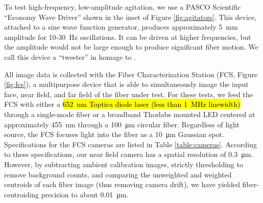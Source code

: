 \documentclass[twocolumn]{emulateapj}
\begin{document}
To test high-frequency, low-amplitude agitation, we use a PASCO Scientific ``Economy Wave Driver'' shown in the inset of Figure \ref{fig:agitators}. This device, attached to a sine wave function generator, produces approximately \SI{5}{\milli\meter} amplitude for 10-\SI{30}{\hertz} oscillations. It can be driven at higher frequencies, but the amplitude would not be large enough to produce significant fiber motion. We call this device a ``tweeter'' in homage to \citet{Plavchan2013}.

All image data is collected with the Fiber Characterization Station (FCS, Figure \ref{fig:fcs}), a multipurpose device that is able to simultaneously image the input face, near field, and far field of the fiber under test. For these tests, we feed the FCS with either a \hl{{\SI{652}{\nano\meter}} Toptica diode laser (less than {\SI{1}{\mega\hertz}} linewidth)} through a single-mode fiber or a broadband Thorlabs mounted LED centered at approximately \SI{455}{\nano\meter} through a \SI{100}{\micro\meter} circular fiber. Regardless of light source, the FCS focuses light into the fiber as a \SI{10}{\micro\meter} Gaussian spot. Specifications for the FCS cameras are listed in Table \ref{table:cameras}. According to these specifications, our near field camera has a spatial resolution of \SI{0.3}{\micro\meter}. However, by subtracting ambient calibration images, strictly thresholding to remove background counts, and comparing the unweighted and weighted centroids of each fiber image (thus removing camera drift), we have yielded fiber-centroiding precision to about \SI{0.01}{\micro\meter}.
\end{document}
